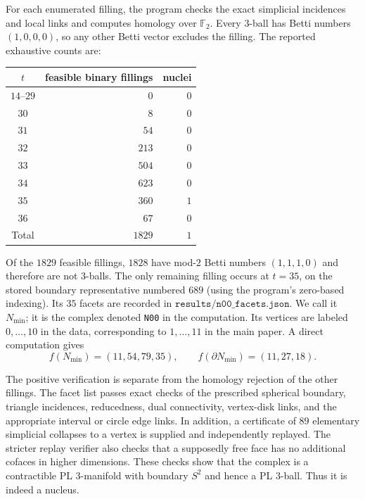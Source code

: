 \documentclass[11pt]{article}
\begin{document}
For each enumerated filling, the program checks the exact simplicial
incidences and local links and computes homology over $\mathbb F_2$.
Every $3$-ball has Betti numbers $(1,0,0,0)$, so any other Betti vector
excludes the filling.  The reported exhaustive counts are:

\begin{center}
\begin{tabular}{@{}c r r@{}}
\toprule
$t$ & feasible binary fillings & nuclei\\
\midrule
$14$--$29$ & $0$ & $0$\\
$30$ & $8$ & $0$\\
$31$ & $54$ & $0$\\
$32$ & $213$ & $0$\\
$33$ & $504$ & $0$\\
$34$ & $623$ & $0$\\
$35$ & $360$ & $1$\\
$36$ & $67$ & $0$\\
\midrule
Total & $1829$ & $1$\\
\bottomrule
\end{tabular}
\end{center}

Of the $1829$ feasible fillings, $1828$ have mod-$2$ Betti numbers
$(1,1,1,0)$ and therefore are not $3$-balls.  The only remaining filling
occurs at $t=35$, on the stored boundary representative numbered $689$
(using the program's zero-based indexing).  Its $35$ facets are recorded in
$\texttt{results/n00\_facets.json}$.  We call it $N_{\min}$; it is the
complex denoted \texttt{N00} in the computation.  Its vertices are labeled
$0,\ldots,10$ in the data, corresponding to $1,\ldots,11$ in the main paper.
A direct computation gives
\[
 f(N_{\min})=(11,54,79,35),\qquad
 f(\partial N_{\min})=(11,27,18).
\]

The positive verification is separate from the homology rejection of the
other fillings.  The facet list passes exact checks of the prescribed
spherical boundary, triangle incidences, reducedness, dual connectivity,
vertex-disk links, and the appropriate interval or circle edge links.
In addition, a certificate of $89$ elementary simplicial collapses to a
vertex is supplied and independently replayed.  The stricter replay
verifier also checks that a supposedly free face has no additional
cofaces in higher dimensions.  These checks show that the complex is a
contractible PL $3$-manifold with boundary $S^2$ and hence a PL $3$-ball.
Thus it is indeed a nucleus.
\end{document}
